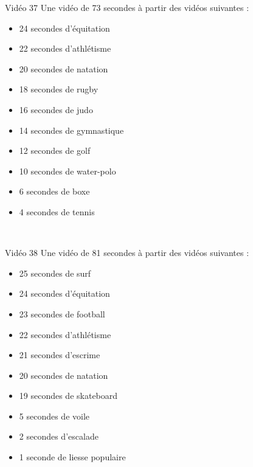 \documentclass[10pt, a5paper,twoside]{article}
\begin{document}
\begin{card}[width = \textwidth, colback = olympicviolet, colframe = olympicviolet, bottomtitle = 2mm]{Vidéo 37}
  Une vidéo de 73 secondes à partir des vidéos suivantes :
  \vspace{-1mm}\begin{itemize}
    \item 24 secondes d'équitation
    \item 22 secondes d'athlétisme
    \item 20 secondes de natation
    \item 18 secondes de rugby
    \item 16 secondes de judo
    \item 14 secondes de gymnastique
    \item 12 secondes de golf
    \item 10 secondes de water-polo
    \item 6 secondes de boxe
    \item 4 secondes de tennis
  \end{itemize}
\end{card}

\vfill

\clearpage
~
\vfill

\begin{card}[width = \textwidth, colback = olympicviolet, colframe = olympicviolet, bottomtitle = 2mm]{Vidéo 38}
  Une vidéo de 81 secondes à partir des vidéos suivantes :
  \vspace{-1mm}\begin{itemize}
    \item 25 secondes de surf
    \item 24 secondes d'équitation
    \item 23 secondes de football
    \item 22 secondes d'athlétisme
    \item 21 secondes d'escrime
    \item 20 secondes de natation
    \item 19 secondes de skateboard
    \item 5 secondes de voile
    \item 2 secondes d'escalade
    \item 1 seconde de liesse populaire
  \end{itemize}
\end{card}

\vfill

\clearpage
~
\vfill
\end{document}
